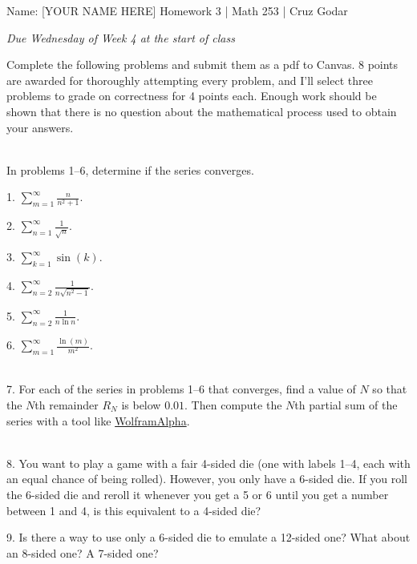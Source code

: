 \documentclass{article}
\begin{document}
\Large Name: [YOUR NAME HERE] \hfill Homework 3 | Math 253 | Cruz Godar \vspace{4pt} \normalsize

\textit{Due Wednesday of Week 4 at the start of class}

Complete the following problems and submit them as a pdf to Canvas. 8 points are awarded for thoroughly attempting every problem, and I'll select three problems to grade on correctness for 4 points each. Enough work should be shown that there is no question about the mathematical process used to obtain your answers.

~\\

In problems 1--6, determine if the series converges.

1. $\displaystyle \sum_{m = 1}^\infty \frac{n}{n^2 + 1}$.

2. $\displaystyle \sum_{n = 1}^\infty \frac{1}{\sqrt{n}}$.

3. $\displaystyle \sum_{k = 1}^\infty \sin(k)$.

4. $\displaystyle \sum_{n = 2}^\infty \frac{1}{n \sqrt{n^2 - 1}}$.

5. $\displaystyle \sum_{n = 2}^\infty \frac{1}{n\ln{n}}$.

6. $\displaystyle \sum_{m = 1}^\infty \frac{\ln(m)}{m^2}$.

~\\

7. For each of the series in problems 1--6 that converges, find a value of $N$ so that the $N$th remainder $R_N$ is below $0.01$. Then compute the $N$th partial sum of the series with a tool like \href{www.wolframalpha.com/}{WolframAlpha}.

~\\

8. You want to play a game with a fair 4-sided die (one with labels 1--4, each with an equal chance of being rolled). However, you only have a 6-sided die. If you roll the 6-sided die and reroll it whenever you get a 5 or 6 until you get a number between 1 and 4, is this equivalent to a 4-sided die?

9. Is there a way to use only a 6-sided die to emulate a 12-sided one? What about an 8-sided one? A 7-sided one?
\end{document}
